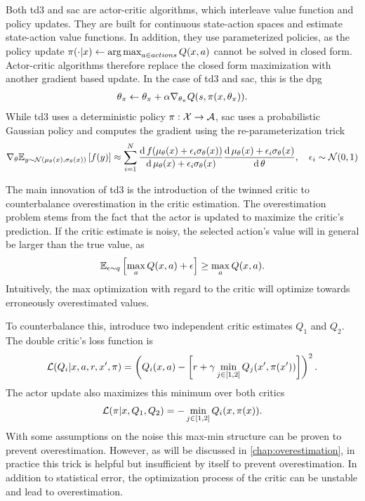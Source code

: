 Both \ac{td3} and \ac{sac} are actor-critic algorithms, which interleave value function and policy updates.
They are built for continuous state-action spaces and estimate state-action value functions.
In addition, they use parameterized policies, as the policy update $\pi(\cdot|x) \leftarrow \operatorname*{arg\,max}_{a \in actions} Q(x,a)$ cannot be solved in closed form.
Actor-critic algorithms therefore replace the closed form maximization with another gradient based update.
In the case of \ac{td3} and \ac{sac}, this is the \ac{dpg} \parencite{silver2014deterministic}
\begin{align}
    \theta_\pi \leftarrow \theta_\pi + \alpha \nabla_{\theta_\pi} Q(s, \pi(x, \theta_\pi)).
\end{align}
While \ac{td3} uses a deterministic policy $\pi: \mathcal{X} \rightarrow \mathcal{A}$, \ac{sac} uses a probabilistic Gaussian policy and computes the gradient using the re-parameterization trick
\begin{align}
    \nabla_{\theta} \mathbb{E}_{y \sim \mathcal{N}(\mu_\theta(x), \sigma_\theta(x))}\left[  f(y) \right] \approx \sum_{i=1}^{N} \frac{\mathrm{d}\,f(\mu_\theta(x) + \epsilon_i \sigma_\theta(x))}{\mathrm{d}\, \mu_\theta(x) + \epsilon_i \sigma_\theta(x)}  \frac{\mathrm{d}\,\mu_\theta(x) + \epsilon_i \sigma_\theta(x)}{\mathrm{d}\,\theta}, \quad \epsilon_i \sim \mathcal{N}(0,1)
\end{align}

The main innovation of \ac{td3} is the introduction of the twinned critic to counterbalance overestimation in the critic estimation.
The overestimation problem stems from the fact that the actor is updated to maximize the critic's prediction.
If the critic estimate is noisy, the selected action's value will in general be larger than the true value, as
\begin{align}
    \mathbb{E}_{\epsilon\sim q}\left[  \max_a Q(x,a) + \epsilon \right] \geq \max_a Q(x,a).
\end{align}
Intuitively, the max optimization with regard to the critic will optimize towards erroneously overestimated values.

To counterbalance this, \textcite{fujimoto2018addressing} introduce two independent critic estimates $Q_1$ and $Q_2$.
The double critic's loss function is
\begin{align}
    \mathcal{L}(Q_i| x, a, r, x', \pi) = \left(Q_i(x,a) - \left[r + \gamma \min_{j \in [1,2]}Q_j(x', \pi(x'))\right]\right)^2.
\end{align}
The actor update also maximizes this minimum over both critics
\begin{align}
    \mathcal{L}(\pi| x, Q_1, Q_2) = - \min_{j \in [1,2]} Q_i(x, \pi(x)).
\end{align}
With some assumptions on the noise this max-min structure can be proven to prevent overestimation.
However, as will be discussed in \autoref{chap:overestimation}, in practice this trick is helpful but insufficient by itself to prevent overestimation.
In addition to statistical error, the optimization process of the critic can be unstable and lead to overestimation.


